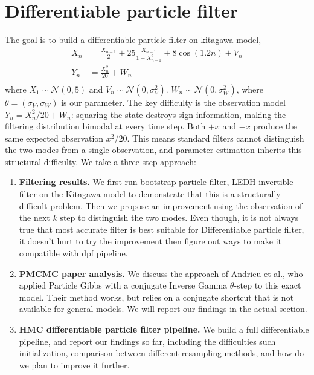 \documentclass{article}
\begin{document}
\clearpage

\section{Differentiable particle filter}

The goal is to build a differentiable particle filter on kitagawa model,
\begin{equation}
\begin{split}
X_n &= \frac{X_{n-1}}{2} + 25 \frac{X_{n-1}}{1 + X_{n-1}^2} + 8 \cos(1.2n) + V_n \\
Y_n &= \frac{X_n^2}{20} + W_n \\
\end{split}
\end{equation}
where $ X_1 \sim \mathcal{N}(0, 5)$ and
$ V_n \sim \mathcal{N}(0, \sigma_V^2)$.
$ W_n \sim \mathcal{N}(0, \sigma_W^2)$, where $\theta=(\sigma_V,\sigma_W)$ is our parameter. The key difficulty is the observation model $Y_n = X_n^2/20 + W_n$: squaring the state destroys sign information, making the filtering distribution bimodal at every time step. Both $+x$ and $-x$ produce the same expected observation $x^2/20$. This means standard filters cannot distinguish the two modes from a single observation, and parameter estimation inherits this structural difficulty. We take a three-step approach:
\begin{enumerate}
    \item \textbf{Filtering results.} We first run bootstrap particle filter, LEDH invertible filter on the Kitagawa model to demonstrate that this is a structurally difficult problem. Then we propose an improvement using the observation of the next $k$ step to distinguish the two modes. Even though, it is not always true that most accurate filter is best suitable for Differentiable particle filter, it doesn't hurt to try the improvement then figure out ways to make it compatible with dpf pipeline.

    \item \textbf{PMCMC paper analysis.} We discuss the approach of Andrieu et al.\cite{Andrieu2010}, who applied Particle Gibbs with a conjugate Inverse Gamma $\theta$-step to this exact model. Their method works, but relies on a conjugate shortcut that is not available for general models. We will report our findings in the actual section.
 
     \item \textbf{HMC differentiable particle filter pipeline.} We build a full differentiable pipeline, and report our findings so far, including the difficulties such initialization, comparison between different resampling methods, and how do we plan to improve it further.
     
    \end{enumerate}
\end{document}
